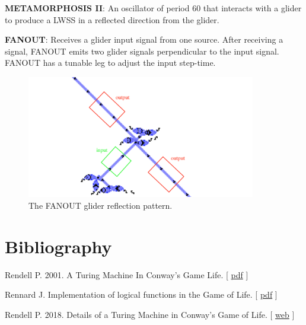 \documentclass{article}
\begin{document}
\vspace{1em}

\noindent\textbf{METAMORPHOSIS II}: An oscillator of period 60 that interacts with a glider to produce a LWSS in a reflected direction from the glider.

\vspace{1em}

\noindent\textbf{FANOUT}: Receives a glider input signal from one source. After receiving a signal, FANOUT emits two glider signals perpendicular to the input signal. FANOUT has a tunable leg to adjust the input step-time.

\vspace{1em}

\begin{figure}[h]
\centering
\includegraphics[width=10cm,keepaspectratio]{images/FANOUT.png}
\captionsetup{labelformat=empty} \caption{The FANOUT glider reflection pattern.}
\end{figure}




\section*{Bibliography}


\noindent 
  Rendell P. 2001. A Turing Machine In Conway's Game Life. [
\href{https://www.ics.uci.edu/~welling/teaching/271fall09/Turing-Machine-Life.pdf}{pdf}
]
  

\vspace*{0.2cm}


\noindent 
  Rennard J. Implementation of logical functions in the Game of Life. [
\href{http://www.rennard.org/alife/CollisionBasedRennard.pdf}{pdf}
]
  

\vspace*{0.2cm}


\noindent 
  Rendell P. 2018. Details of a Turing Machine in Conway's Game of Life. [
\href{http://rendell-attic.org/gol/tmdetails.htm}{web}
]
  
\end{document}
